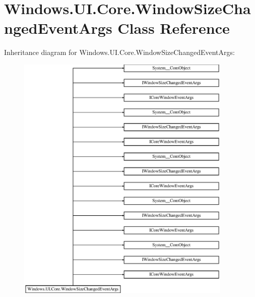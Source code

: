 \hypertarget{class_windows_1_1_u_i_1_1_core_1_1_window_size_changed_event_args}{}\section{Windows.\+U\+I.\+Core.\+Window\+Size\+Changed\+Event\+Args Class Reference}
\label{class_windows_1_1_u_i_1_1_core_1_1_window_size_changed_event_args}
Inheritance diagram for Windows.\+U\+I.\+Core.\+Window\+Size\+Changed\+Event\+Args\+:\begin{figure}[H]
\begin{center}
\leavevmode
\includegraphics[height=12.000000cm]{class_windows_1_1_u_i_1_1_core_1_1_window_size_changed_event_args}
\end{center}
\end{figure}
